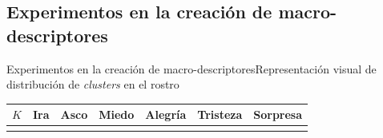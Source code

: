\documentclass{beamer}
\begin{document}
	\subsection{Experimentos en la creación de macro-descriptores}
	\begin{frame}{Experimentos en la creación de macro-descriptores}{Representación visual de distribución de \textit{clusters} en el rostro}
		\newlength{\st}
		\setlength{\st}{1.4cm}
		\setlength{\sz}{1.5cm}
		\begin{table}[tb]
			\centering
			\begin{tabular}{ >{\centering\arraybackslash}m{.5cm}  >{\centering\arraybackslash}m{\st}  >{\centering\arraybackslash}m{\st}  >{\centering\arraybackslash}m{\st}  >{\centering\arraybackslash}m{\st}  >{\centering\arraybackslash}m{\st}  >{\centering\arraybackslash}m{\st}  }
				\hline\noalign{\smallskip}
				$K$ & Ira & Asco & Miedo & Alegría & Tristeza & Sorpresa\\
				\hline\noalign{\smallskip}

\end{tabular}
\end{table}
\end{frame}
\end{document}

